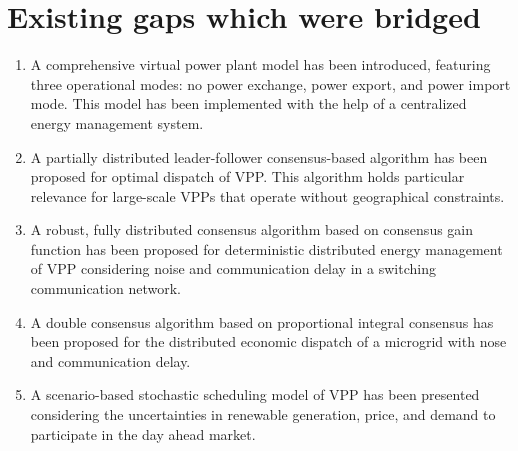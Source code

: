 \documentclass
    [phd,synopsis]
    {iitmdissertation}
\begin{document}
\section{Existing gaps which were bridged}
\begin{enumerate}[start=1,label={(RG \arabic*):}]
    \item A comprehensive virtual power plant model has been introduced, featuring three operational modes: no power exchange, power export, and power import mode. This model has been implemented with the help of a centralized energy management system. 
    \item A partially distributed leader-follower consensus-based algorithm has been proposed for optimal dispatch of VPP.  This algorithm holds particular relevance for large-scale VPPs that operate without geographical constraints.
    \item A robust, fully distributed consensus algorithm based on consensus gain function has been proposed for deterministic distributed energy management of VPP considering noise and communication delay in a switching communication network.
    \item A double consensus algorithm based on proportional integral consensus has been proposed for the distributed economic dispatch of a microgrid with nose and communication delay.
    \item A scenario-based stochastic scheduling model of VPP has been presented considering the uncertainties in renewable generation, price, and demand to participate in the day ahead market.
\end{enumerate}
\end{document}
